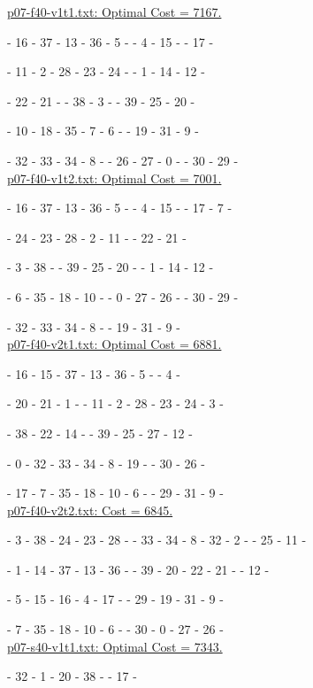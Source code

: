 \underline{p07-f40-v1t1.txt: Optimal Cost =  7167.} 

\ta - 16 - 37 - 13 - 36 - 5 - \ta - 4 - 15 - \ta - 17 - \ta 

\tc - 11 - 2 - 28 - 23 - 24 - \tc - 1 - 14 - 12 - \tc 

\tc - 22 - 21 - \tc - 38 - 3 - \tc - 39 - 25 - 20 - \tc 

\td - 10 - 18 - 35 - 7 - 6 - \td - 19 - 31 - 9 - \td 

\td - 32 - 33 - 34 - 8 - \td - 26 - 27 - 0 - \td - 30 - 29 - \td 
\\

\underline{p07-f40-v1t2.txt: Optimal Cost = 7001.} 

\ta - 16 - 37 - 13 - 36 - 5 - \ta - 4 - 15 - \ta - 17 - 7 - \ta 

\tc - 24 - 23 - 28 - 2 - 11 - \tc - 22 - 21 - \tc 

\tc - 3 - 38 - \tc - 39 - 25 - 20 - \tc - 1 - 14 - 12 - \tc 

\te - 6 - 35 - 18 - 10 - \te - 0 - 27 - 26 - \te - 30 - 29 - \te

\te - 32 - 33 - 34 - 8 - \te - 19 - 31 - 9 - \te 
\\

\underline{p07-f40-v2t1.txt: Optimal Cost = 6881.}
 
\ta - 16 - 15 - 37 - 13 - 36 - 5 - \ta - 4 - \ta 

\tc - 20 - 21 - 1 - \tc - 11 - 2 - 28 - 23 - 24 - 3 - \tc 

\tc - 38 - 22 - 14 - \tc - 39 - 25 - 27 - 12 - \tc 

\te - 0 - 32 - 33 - 34 - 8 - 19 - \te - 30 - 26 - \te 

\te - 17 - 7 - 35 - 18 - 10 - 6 - \te - 29 - 31 - 9 - \te 
\\

\underline{p07-f40-v2t2.txt: Cost =   6845.} 

\tb - 3 - 38 - 24 - 23 - 28 - \tb - 33 - 34 - 8 - 32 - 2 - \tb - 25 - 11 - \tb 

\tc - 1 - 14 - 37 - 13 - 36 - \tc - 39 - 20 - 22 - 21 - \tc - 12 - \tc 

\te - 5 - 15 - 16 - 4 - 17 - \te - 29 - 19 - 31 - 9 - \te 

\te - 7 - 35 - 18 - 10 - 6 - \te - 30 - 0 - 27 - 26 - \te 
\\

\underline{p07-s40-v1t1.txt: Optimal Cost = 7343.}

\ta - 32 - 1 - 20 - 38 - \ta - 17 - \ta 

